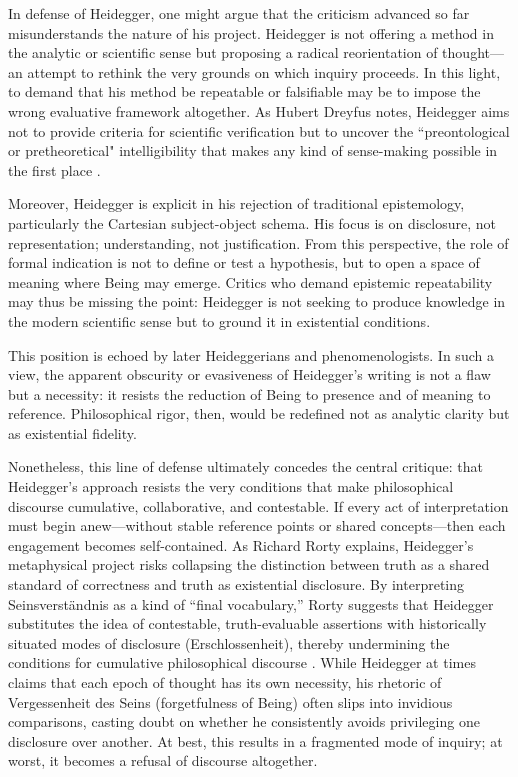 \documentclass{article}
\begin{document}
In defense of Heidegger, one might argue that the criticism advanced so far misunderstands the nature of his project. Heidegger is not offering a method in the analytic or scientific sense but proposing a radical reorientation of thought—an attempt to rethink the very grounds on which inquiry proceeds. In this light, to demand that his method be repeatable or falsifiable may be to impose the wrong evaluative framework altogether. As Hubert Dreyfus notes, Heidegger aims not to provide criteria for scientific verification but to uncover the “preontological or pretheoretical" intelligibility that makes any kind of sense-making possible in the first place \parencite[pp.~19--23]{dreyfus1991}.

Moreover, Heidegger is explicit in his rejection of traditional epistemology, particularly the Cartesian subject-object schema. His focus is on disclosure, not representation; understanding, not justification. From this perspective, the role of formal indication is not to define or test a hypothesis, but to open a space of meaning where Being may emerge. Critics who demand epistemic repeatability may thus be missing the point: Heidegger is not seeking to produce knowledge in the modern scientific sense but to ground it in existential conditions.

This position is echoed by later Heideggerians and phenomenologists. In such a view, the apparent obscurity or evasiveness of Heidegger's writing is not a flaw but a necessity: it resists the reduction of Being to presence and of meaning to reference. Philosophical rigor, then, would be redefined not as analytic clarity but as existential fidelity.

Nonetheless, this line of defense ultimately concedes the central critique: that Heidegger's approach resists the very conditions that make philosophical discourse cumulative, collaborative, and contestable. If every act of interpretation must begin anew—without stable reference points or shared concepts—then each engagement becomes self-contained. As Richard Rorty explains, Heidegger’s metaphysical project risks collapsing the distinction between truth as a shared standard of correctness and truth as existential disclosure. By interpreting Seinsverständnis as a kind of “final vocabulary,” Rorty suggests that Heidegger substitutes the idea of contestable, truth-evaluable assertions with historically situated modes of disclosure (Erschlossenheit), thereby undermining the conditions for cumulative philosophical discourse \parencite[pp.~38-39]{rorty1991}. While Heidegger at times claims that each epoch of thought has its own necessity, his rhetoric of Vergessenheit des Seins (forgetfulness of Being) often slips into invidious comparisons, casting doubt on whether he consistently avoids privileging one disclosure over another. At best, this results in a fragmented mode of inquiry; at worst, it becomes a refusal of discourse altogether.
\end{document}
